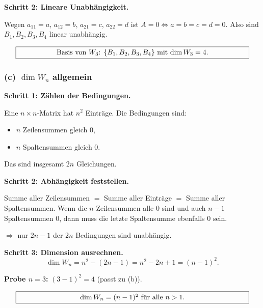 \documentclass[a4paper,12pt]{article}
\begin{document}
\textbf{Schritt 2: Lineare Unabh\"angigkeit.}

Wegen $a_{11} = a$, $a_{12} = b$, $a_{21} = c$, $a_{22} = d$ ist $A = 0 \iff a = b = c = d = 0$. Also sind $B_1, B_2, B_3, B_4$ linear unabh\"angig.

\[
\fbox{\parbox{0.93\textwidth}{\centering
Basis von $W_3$: $\{B_1, B_2, B_3, B_4\}$ mit $\dim W_3 = 4$.
}}
\]

\subsubsection*{(c) $\dim W_n$ allgemein}

\textbf{Schritt 1: Z\"ahlen der Bedingungen.}

Eine $n \times n$-Matrix hat $n^2$ Eintr\"age. Die Bedingungen sind:
\begin{itemize}[nosep, leftmargin=*]
\item $n$ Zeilensummen gleich $0$,
\item $n$ Spaltensummen gleich $0$.
\end{itemize}
Das sind insgesamt $2n$ Gleichungen.

\textbf{Schritt 2: Abh\"angigkeit feststellen.}

Summe aller Zeilensummen $=$ Summe aller Eintr\"age $=$ Summe aller Spaltensummen. Wenn die $n$ Zeilensummen alle $0$ sind und auch $n-1$ Spaltensummen $0$, dann muss die letzte Spaltensumme ebenfalls $0$ sein.

$\Rightarrow$ nur $2n - 1$ der $2n$ Bedingungen sind unabh\"angig.

\textbf{Schritt 3: Dimension ausrechnen.}
\[
\dim W_n = n^2 - (2n - 1) = n^2 - 2n + 1 = (n-1)^2.
\]

\textbf{Probe $n = 3$:} $(3-1)^2 = 4$ \checkmark (passt zu (b)).

\[
\fbox{\parbox{0.93\textwidth}{\centering
$\dim W_n = (n-1)^2$ f\"ur alle $n > 1$.
}}
\]
\end{document}
